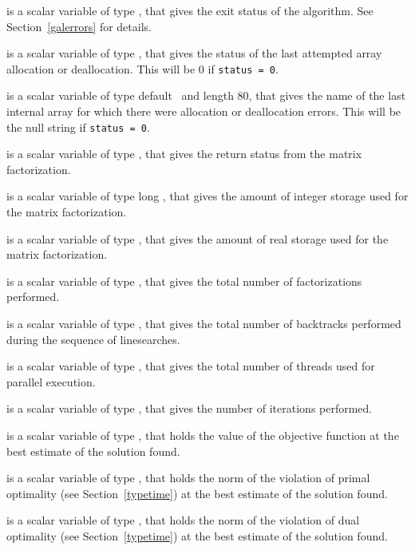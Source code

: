 \documentclass{galahad}
\begin{document}
\begin{description}

 is a scalar variable of type \integer, that gives the
exit status of the algorithm.
See Section~\ref{galerrors}
for details.

 is a scalar variable of type \integer, that gives
the status of the last attempted array allocation or deallocation.
This will be 0 if {\tt status = 0}.

 is a scalar variable of type default \character\
and length 80, that  gives the name of the last internal array
for which there were allocation or deallocation errors.
This will be the null string if {\tt status = 0}.

 is a scalar variable of type \integer, that
gives the return status from the matrix factorization.

 is a scalar variable of type long
\integer, that gives the amount of integer storage used for the matrix
factorization.

 is a scalar variable of type \longinteger,
that gives the amount of real storage used for the matrix factorization.

 is a scalar variable of type \integer, that gives the
total number of factorizations performed.

 is a scalar variable of type \integer, that gives the
total number of backtracks performed during the sequence of linesearches.

 is a scalar variable of type \integer, that gives the
total number of threads used for parallel execution.

 is a scalar variable of type \integer, that
gives the number of iterations performed.

 is a scalar variable of type \realdp, that holds the
value of the objective function at the best estimate of the solution found.

 is a scalar variable of type \realdp,
that holds the norm of the violation of primal optimality
(see Section~\ref{typetime}) at the best estimate of the solution found.

 is a scalar variable of type \realdp,
that holds the norm of the violation of dual optimality
(see Section~\ref{typetime}) at the best estimate of the solution found.


\end{description}
\end{document}

